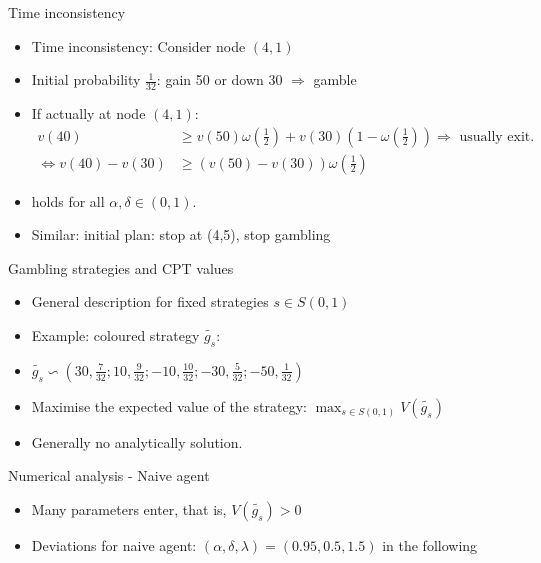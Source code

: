 \documentclass[11pt, aspectratio=169]{beamer}
\begin{document}
\begin{frame}{Time inconsistency}
    \begin{itemize}
        \item Time inconsistency: Consider node $(4,1)$\bigskip
        \item Initial probability $\frac{1}{32}$: gain 50 or down 30  $\Rightarrow$ gamble\bigskip
        \item If actually at node $(4,1)$:
        \begin{align*}v(40) &\geq v(50)\omega \left(\frac{1}{2}\right)+v(30)\left(1-\omega \left(\frac{1}{2}\right)\right) \Rightarrow \text{ usually exit.}\\
        \Leftrightarrow v(40)-v(30) &\geq (v(50)-v(30))\omega \left(\frac{1}{2}\right)\end{align*}
        \item  holds for all $\alpha, \delta \in (0,1)$.\bigskip
        \item Similar: initial plan: stop at (4,5), stop gambling\bigskip
    \end{itemize}
\end{frame}


\begin{frame}{Gambling strategies and CPT values}
    \begin{itemize}
        \item General description for fixed strategies $s \in S(0,1)$\bigskip
        \item Example: coloured strategy $\tilde{g_s}$:\bigskip
        \item $\tilde{g_s} \backsim \left(30,\frac{7}{32}; 10,\frac{9}{32}; -10, \frac{10}{32}; -30,\frac{5}{32};-50,\frac{1}{32} \right)  $\bigskip
        \item Maximise the expected value of the strategy: $\max_{s \in S(0,1)} V(\tilde{g_s})$\bigskip
        \item Generally no analytically solution.\bigskip
    \end{itemize}
\end{frame}

\begin{frame}{Numerical analysis - Naive agent}
    \begin{itemize}
        \item Many parameters enter, that is, $V(\tilde{g_s})>0 $\medskip
        \item Deviations for naive agent: $(\alpha,\delta,\lambda)=(0.95,0.5,1.5)$ in the following\medskip
    \end{itemize}
\end{frame}
\end{document}
